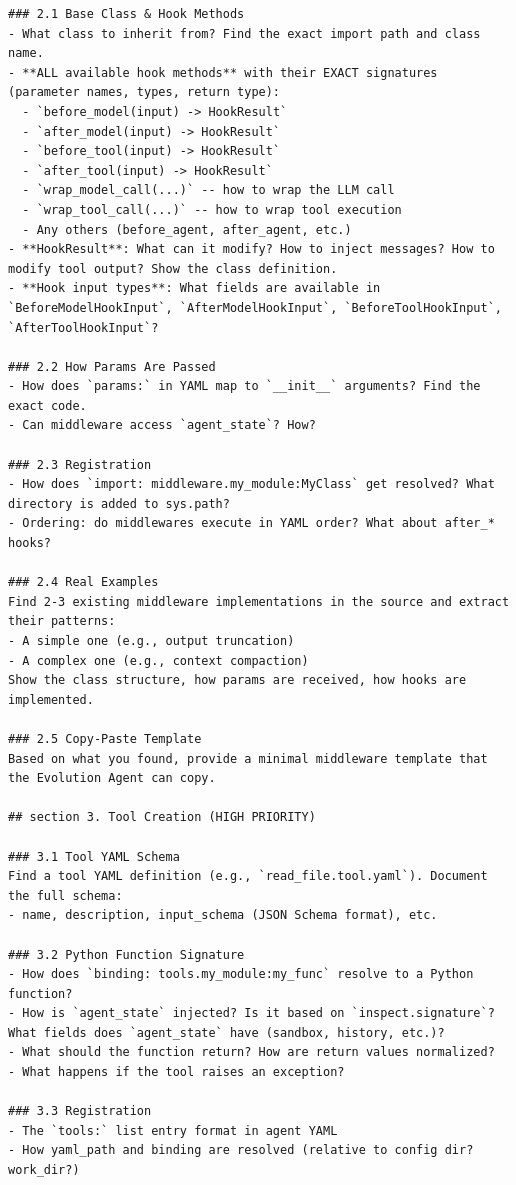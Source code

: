 \begin{tcolorbox}
\begin{lstlisting}
### 2.1 Base Class & Hook Methods
- What class to inherit from? Find the exact import path and class name.
- **ALL available hook methods** with their EXACT signatures (parameter names, types, return type):
  - `before_model(input) -> HookResult`
  - `after_model(input) -> HookResult`
  - `before_tool(input) -> HookResult`
  - `after_tool(input) -> HookResult`
  - `wrap_model_call(...)` -- how to wrap the LLM call
  - `wrap_tool_call(...)` -- how to wrap tool execution
  - Any others (before_agent, after_agent, etc.)
- **HookResult**: What can it modify? How to inject messages? How to modify tool output? Show the class definition.
- **Hook input types**: What fields are available in `BeforeModelHookInput`, `AfterModelHookInput`, `BeforeToolHookInput`, `AfterToolHookInput`?

### 2.2 How Params Are Passed
- How does `params:` in YAML map to `__init__` arguments? Find the exact code.
- Can middleware access `agent_state`? How?

### 2.3 Registration
- How does `import: middleware.my_module:MyClass` get resolved? What directory is added to sys.path?
- Ordering: do middlewares execute in YAML order? What about after_* hooks?

### 2.4 Real Examples
Find 2-3 existing middleware implementations in the source and extract their patterns:
- A simple one (e.g., output truncation)
- A complex one (e.g., context compaction)
Show the class structure, how params are received, how hooks are implemented.

### 2.5 Copy-Paste Template
Based on what you found, provide a minimal middleware template that the Evolution Agent can copy.

## section 3. Tool Creation (HIGH PRIORITY)

### 3.1 Tool YAML Schema
Find a tool YAML definition (e.g., `read_file.tool.yaml`). Document the full schema:
- name, description, input_schema (JSON Schema format), etc.

### 3.2 Python Function Signature
- How does `binding: tools.my_module:my_func` resolve to a Python function?
- How is `agent_state` injected? Is it based on `inspect.signature`? What fields does `agent_state` have (sandbox, history, etc.)?
- What should the function return? How are return values normalized?
- What happens if the tool raises an exception?

### 3.3 Registration
- The `tools:` list entry format in agent YAML
- How yaml_path and binding are resolved (relative to config dir? work_dir?)


\end{lstlisting}
\end{tcolorbox}
